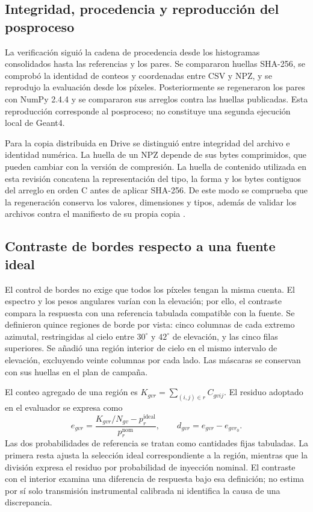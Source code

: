 \documentclass[11pt,a4paper]{article}
\begin{document}
\subsection{Integridad, procedencia y reproducción del posproceso}

La verificación siguió la cadena de procedencia desde los histogramas consolidados hasta las referencias y los pares. Se compararon huellas SHA-256, se comprobó la identidad de conteos y coordenadas entre CSV y NPZ, y se reprodujo la evaluación desde los píxeles. Posteriormente se regeneraron los pares con NumPy 2.4.4 y se compararon sus arreglos contra las huellas publicadas. Esta reproducción corresponde al posproceso; no constituye una segunda ejecución local de Geant4.

Para la copia distribuida en Drive se distinguió entre integridad del archivo e identidad numérica. La huella de un NPZ depende de sus bytes comprimidos, que pueden cambiar con la versión de compresión. La huella de contenido utilizada en esta revisión concatena la representación del tipo, la forma y los bytes contiguos del arreglo en orden C antes de aplicar SHA-256. De este modo se comprueba que la regeneración conserva los valores, dimensiones y tipos, además de validar los archivos contra el manifiesto de su propia copia \cite{drive}.

\subsection{Contraste de bordes respecto a una fuente ideal}

El control de bordes no exige que todos los píxeles tengan la misma cuenta. El espectro y los pesos angulares varían con la elevación; por ello, el contraste compara la respuesta con una referencia tabulada compatible con la fuente. Se definieron quince regiones de borde por vista: cinco columnas de cada extremo azimutal, restringidas al cielo entre $30^\circ$ y $42^\circ$ de elevación, y las cinco filas superiores. Se añadió una región interior de cielo en el mismo intervalo de elevación, excluyendo veinte columnas por cada lado. Las máscaras se conservan con sus huellas en el plan de campaña.

El conteo agregado de una región es $K_{gvr}=\sum_{(i,j)\in r}C_{gvij}$. El residuo adoptado en el evaluador se expresa como
\begin{equation}
 e_{gvr}=\frac{K_{gvr}/N_{gv}-p^{\mathrm{ideal}}_r}{p^{\mathrm{nom}}_r},
 \qquad d_{gvr}=e_{gvr}-e_{gvr_0}.
 \label{eq:residuo}
\end{equation}
Las dos probabilidades de referencia se tratan como cantidades fijas tabuladas. La primera resta ajusta la selección ideal correspondiente a la región, mientras que la división expresa el residuo por probabilidad de inyección nominal. El contraste con el interior examina una diferencia de respuesta bajo esa definición; no estima por sí solo transmisión instrumental calibrada ni identifica la causa de una discrepancia.
\end{document}
